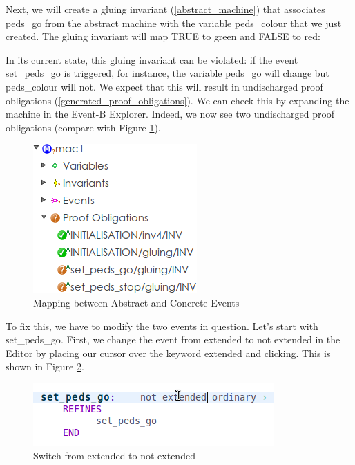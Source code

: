 Next, we will create a gluing invariant (\ref{abstract_machine}) that associates \textsf{peds\_go} from the abstract machine with the variable \textsf{peds\_colour} that we just created.  The gluing invariant will map \textsf{TRUE} to \textsf{green} and \textsf{FALSE} to \textsf{red}:


In its current state, this gluing invariant can be violated: if the event \textsf{set\_peds\_go} is triggered, for instance, the variable \textsf{peds\_go} will change but \textsf{peds\_colour} will not.  We expect that this will result in undischarged proof obligations (\ref{generated_proof_obligations}).  We can check this by expanding the machine in the Event-B Explorer.  Indeed, we now see two undischarged proof obligations (compare with Figure \ref{fig_tut_07_undischarged}).

\begin{figure}[!ht]
\begin{center}
	\includegraphics{img/tutorial/undischarged1.png}
	\caption{Mapping between Abstract and Concrete Events}
	\label{fig_tut_07_undischarged}
\end{center}
\end{figure}

To fix this, we have to modify the two events in question.  Let's start with \textsf{set\_peds\_go}.  First, we change the event from extended to not extended in the Editor by placing our cursor over the keyword \textsf{extended} and clicking. This is shown in Figure \ref{fig_tut_07_event_refinement}.

\begin{figure}[!ht]
\begin{center}
	\includegraphics{img/tutorial/tut_07_event_refinement.png}
	\caption{Switch from extended to not extended}
	\label{fig_tut_07_event_refinement}
\end{center}
\end{figure}

